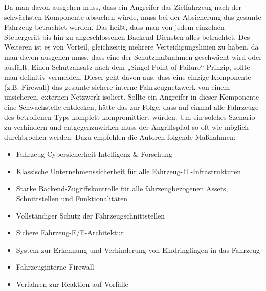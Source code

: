 Da man davon ausgehen muss, dass ein Angreifer das Zielfahrzeug nach der 
schwächsten Komponente absuchen würde, muss bei der Absicherung das gesamte 
Fahrzeug betrachtet werden. Das heißt, dass man von jedem einzelnen Steuergerät 
bis hin zu angeschlossenen Backend-Diensten alles betrachtet. 
\newline
Des Weiteren ist es von Vorteil, gleichzeitig mehrere Verteidigungslinien zu haben, 
da man davon ausgehen muss, dass eine der Schutzmaßnahmen geschwächt wird oder ausfällt.
\newline
Einen Schutzansatz nach dem „Singel Point of Failure“ Prinzip, sollte man definitiv 
vermeiden. Dieser geht davon aus, dass eine einzige Komponente (z.B. Firewall) das 
gesamte sichere interne Fahrzeugnetzwerk von einem unsicheren, externen Netzwerk isoliert. 
Sollte ein Angreifer in dieser Komponente eine Schwachstelle entdecken, hätte das zur 
Folge, dass auf einmal alle Fahrzeuge des betroffenen Typs komplett kompromittiert würden. 
\newline
Um ein solches Szenario zu verhindern und entgegenzuwirken muss der Angriffspfad so 
oft wie möglich durchbrochen werden. Dazu empfehlen die Autoren folgende Maßnahmen:

\begin{itemize}
    \item Fahrzeug-Cybersicherheit Intelligenz $\&$ Forschung
    \item Klassische Unternehmenssicherheit für alle Fahrzeug-IT-Infrastrukturen
    \item Starke Backend-Zugriffskontrolle für alle fahrzeugbezogenen Assets, Schnittstellen 
    und Funktionalitäten
    \item Vollständiger Schutz der Fahrzeugschnittstellen
    \item Sichere Fahrzeug-E/E-Architektur
    \item System zur Erkennung und Verhinderung von Eindringlingen in das Fahrzeug
    \item Fahrzeuginterne Firewall
    \item Verfahren zur Reaktion auf Vorfälle
\end{itemize}
